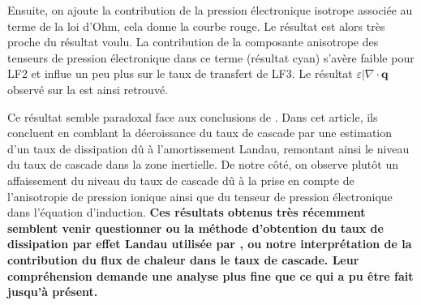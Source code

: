 Ensuite, on ajoute la contribution de la pression électronique isotrope associée au terme  de la loi d'Ohm, cela donne la courbe rouge. Le résultat est alors très proche du résultat voulu. La contribution de la composante anisotrope des tenseurs de pression électronique dans ce terme (résultat cyan) s'avère faible pour LF2 et influe un peu plus sur le taux de transfert de LF3. Le résultat  $\varepsilon|\nabla \cdot \boldsymbol{q}$ observé sur la  est ainsi retrouvé.

Ce résultat semble paradoxal face aux conclusions de . Dans cet article, ils concluent en comblant la décroissance du taux de cascade par une estimation d'un taux de dissipation dû à l'amortissement Landau, remontant ainsi le niveau du taux de cascade dans la zone inertielle. De notre côté, on observe plutôt un affaissement du niveau du taux de cascade dû à la prise en compte de l'anisotropie de pression ionique ainsi que du tenseur de pression électronique dans l'équation d'induction. {\bf Ces résultats obtenus très récemment semblent venir questionner ou la méthode d'obtention du taux de dissipation par effet Landau utilisée par \cite{ferrand_fluid_2021}, ou notre interprétation de la contribution du flux de chaleur dans le taux de cascade. Leur compréhension demande une analyse plus fine que ce qui a pu être fait jusqu'à présent.} 

